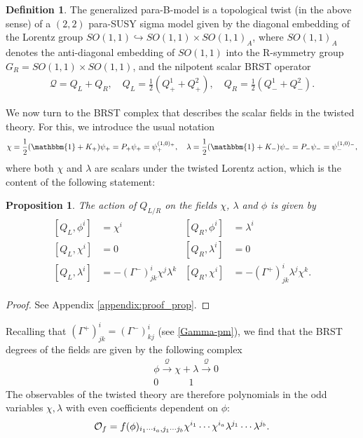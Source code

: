 \documentclass[letterpaper,12pt]{article}
\newcommand{\QQ}{\mathcal{Q}}
\newcommand{\id}{\mathbbm{1}}
\newtheorem{proposition}[theorem]{Proposition}
\theoremstyle{definition}
\newtheorem{Def}[theorem]{Definition}
\theoremstyle{remark}
\theoremstyle{examples}
\begin{document}
\begin{Def}\label{def:B-twist}
The generalized para-B-model is a topological twist (in the above sense) of a $(2,2)$ para-SUSY sigma model given by the diagonal embedding of the Lorentz group $SO(1,1)\hookrightarrow SO(1,1)\times SO(1,1)_A$, where $SO(1,1)_A$ denotes the anti-diagonal embedding of $SO(1,1)$ into the R-symmetry group $G_R=SO(1,1)\times SO(1,1)$, and the nilpotent scalar BRST operator
\begin{align}\label{QQ_nilpotent}
\QQ=Q_L+Q_R,\quad Q_L=\frac{1}{2}(Q^1_++Q^2_+),\quad Q_R=\frac{1}{2}(Q^1_-+Q^2_-).
\end{align}
\end{Def}
\bigskip
We now turn to the BRST complex that describes the scalar fields in the twisted theory. For this, we introduce the usual notation 
\begin{align*}
\chi=\frac{1}{2}(\id+K_+)\psi_+=P_+\psi_+=\psi_+^{(1,0)_+},\quad\lambda=\frac{1}{2}(\id+K_-)\psi_-=P_-\psi_-=\psi_-^{(1,0)_-},
\end{align*}
where both $\chi$ and $\lambda$ are scalars under the twisted Lorentz action, which is the content of the following statement:
\begin{proposition}\label{prop_toptwist}
The action of $Q_{L/R}$ on the fields $\chi$, $\lambda$ and $\phi$ is given by
\begin{align}\label{eq:Qcoh}
\begin{aligned}
[Q_L,\phi^i]&=\chi^i & [Q_R,\phi^i]&=\lambda^i\\
[Q_L,\chi^i]&=0 & [Q_R,\lambda^i]&=0\\
[Q_L,\lambda^i]&=-(\Gamma^-)^i_{jk}\chi^j\lambda^k & [Q_R,\chi^i]&=-(\Gamma^+)^i_{jk}\lambda^j\chi^k.
\end{aligned}
\end{align}
\end{proposition}
\begin{proof}
See Appendix \ref{appendix:proof_prop}.
\end{proof}
Recalling that $(\Gamma^+)^i_{jk}=(\Gamma^-)^i_{kj}$ (see \eqref{Gamma-pm}), we find that the BRST degrees of the fields are given by the following complex
\begin{align*}
&\phi \overset{\QQ}{\longrightarrow}\chi+\lambda\overset{\QQ}{\longrightarrow} 0\\
&0 \phantom{\longrightarrow\longrightarrow} 1
\end{align*}
\noindent
The observables of the twisted theory are therefore polynomials in the odd variables $\chi,\lambda$ with even coefficients dependent on $\phi$:
\begin{align*}
{\cal O}_f=f(\phi)_{i_1\cdots i_a,j_1\cdots j_b}\chi^{i_1}\cdots\chi^{i_a}\lambda^{j_1}\cdots\lambda^{j_b}.
\end{align*}
\end{document}
